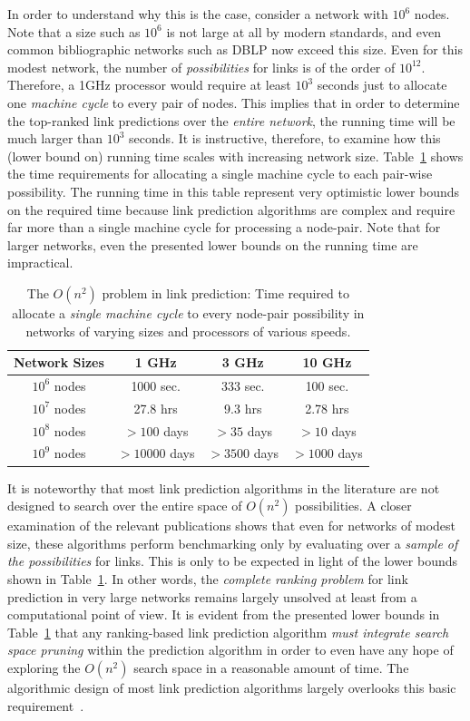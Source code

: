In order to understand why this is the case,
consider a network with $10^6$ nodes. Note that a size such as
$10^6$ is not large at all by modern standards, and even common
bibliographic networks such as DBLP now exceed this size. Even
for this modest network, the number of {\em possibilities} for links
is of the order of $10^{12}$. Therefore, a 1GHz processor would
require at least $10^3$ seconds just to allocate one {\em machine cycle} to
every pair of nodes. This implies that in order to determine the
top-ranked link predictions over the {\em entire network}, the
running time will be much larger than $10^3$ seconds.  It is
instructive, therefore, to examine how this (lower bound on) running
time scales with increasing network size. Table~\ref{time} shows the
time requirements for allocating a single machine cycle to each
pair-wise possibility. The running time in this table represent
very optimistic lower bounds on the required time because link
prediction algorithms are complex and require far more than a single
machine cycle for processing a node-pair. Note that for larger
networks, even the presented lower bounds on the running time are
impractical.
\begin{table}
\caption{The $O(n^2)$ problem in link prediction: Time required to
allocate a {\em single machine cycle} to every node-pair possibility
in networks of varying sizes and processors of various speeds.}
\label{time}
\vspace{0ex}
\centering
\begin{tabular}{cccc}
\hline \hline Network Sizes & 1 GHz &  3 GHz & 10 GHz \\
\hline \hline $10^6$ nodes & 1000 sec. & 333 sec. & 100 sec.\\
\hline $10^7$ nodes & 27.8 hrs &  9.3 hrs &  2.78 hrs\\
\hline $10^8$ nodes & $>100$ days &  $>35$ days & $> 10$ days\\
\hline $10^9$ nodes & $>10000$ days & $>3500$ days & $> 1000$ days\\
\hline \hline
\end{tabular}
\vspace{-2ex}
\end{table}


It is noteworthy that most link prediction algorithms in the
literature are not designed to search over the entire space of
$O(n^2)$ possibilities. A closer examination of the relevant
publications shows that even for networks of modest size, these
algorithms perform benchmarking  only by evaluating over a {\em
sample of the possibilities} for links. This is only to be expected
in light of the lower bounds shown in Table~\ref{time}.  In other
words, the {\em complete ranking problem} for link prediction in
very large networks remains largely unsolved at least from a
computational point of view. It is evident from the presented lower
bounds in Table~\ref{time} that any ranking-based link prediction
algorithm {\em must integrate search space pruning} within the
prediction algorithm in order to even  have any  hope of exploring
the $O(n^2)$ search space in a reasonable amount of time. The
algorithmic design of most link prediction algorithms largely
overlooks this basic requirement~\cite{chancc,propflow}.



